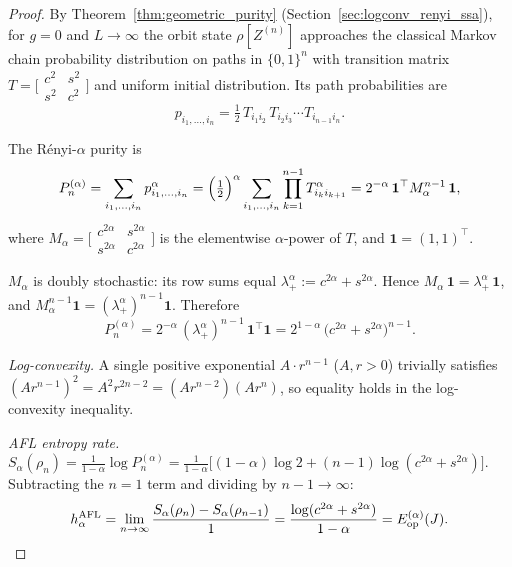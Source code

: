 \documentclass[12pt,a4paper]{article}
\begin{document}
\begin{proof}
By Theorem~\ref{thm:geometric_purity} (Section~\ref{sec:logconv_renyi_ssa}),
for $g=0$ and $L\to\infty$ the orbit state $\rho[Z^{(n)}]$ approaches the
classical Markov chain probability distribution on paths in $\{0,1\}^n$
with transition matrix $T=\bigl[\begin{smallmatrix}c^2&s^2\\s^2&c^2\end{smallmatrix}\bigr]$
and uniform initial distribution.  Its path probabilities are
\[
  p_{i_1,\ldots,i_n}
  = \tfrac{1}{2}\,T_{i_1 i_2}\,T_{i_2 i_3}\cdots T_{i_{n-1}i_n}.
\]

The Rényi-$\alpha$ purity is
\[
  P_n^{(\alpha)}
  = \sum_{i_1,\ldots,i_n} p_{i_1,\ldots,i_n}^\alpha
  = \Bigl(\tfrac{1}{2}\Bigr)^\alpha
    \sum_{i_1,\ldots,i_n}\prod_{k=1}^{n-1}T_{i_k i_{k+1}}^\alpha
  = 2^{-\alpha}\,\mathbf{1}^\top M_\alpha^{n-1}\,\mathbf{1},
\]
where $M_\alpha=\bigl[\begin{smallmatrix}c^{2\alpha}&s^{2\alpha}\\s^{2\alpha}&c^{2\alpha}\end{smallmatrix}\bigr]$
is the elementwise $\alpha$-power of $T$, and $\mathbf{1}=(1,1)^\top$.

$M_\alpha$ is doubly stochastic: its row sums equal $\lambda_+^\alpha:=c^{2\alpha}+s^{2\alpha}$.
Hence $M_\alpha\,\mathbf{1}=\lambda_+^\alpha\,\mathbf{1}$, and
$M_\alpha^{n-1}\mathbf{1}=(\lambda_+^\alpha)^{n-1}\mathbf{1}$.  Therefore
\[
  P_n^{(\alpha)} = 2^{-\alpha}\,(\lambda_+^\alpha)^{n-1}\,\mathbf{1}^\top\mathbf{1}
  = 2^{1-\alpha}\,\bigl(c^{2\alpha}+s^{2\alpha}\bigr)^{n-1}.
\]

\medskip
\noindent\textit{Log-convexity.}
A single positive exponential $A\cdot r^{n-1}$ ($A,r>0$) trivially satisfies
$(A r^{n-1})^2=A^2 r^{2n-2}=(A r^{n-2})(A r^n)$, so equality holds in the
log-convexity inequality.

\medskip
\noindent\textit{AFL entropy rate.}
$S_\alpha(\rho_n)=\frac{1}{1-\alpha}\log P_n^{(\alpha)}
=\frac{1}{1-\alpha}\bigl[(1-\alpha)\log 2 + (n-1)\log(c^{2\alpha}+s^{2\alpha})\bigr]$.
Subtracting the $n=1$ term and dividing by $n-1\to\infty$:
\[
  h_\alpha^{\mathrm{AFL}}
  = \lim_{n\to\infty}\frac{S_\alpha(\rho_n)-S_\alpha(\rho_{n-1})}{1}
  = \frac{\log(c^{2\alpha}+s^{2\alpha})}{1-\alpha}
  = E_{\mathrm{op}}^{(\alpha)}(J).  \qedhere
\]
\end{proof}
\end{document}
